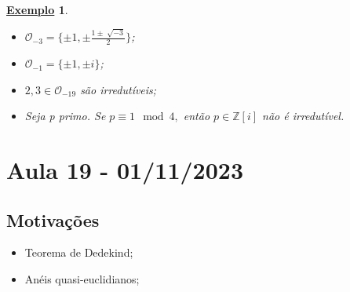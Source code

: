\documentclass{article}
\newtheorem{example}{\underline{Exemplo}}
\begin{document}
\begin{example}
 \begin{itemize}
  \item[1)] \(\mathcal{O}_{-3} = \{\pm1, \pm \frac{1\pm \sqrt[]{-3}}{2}\}\);
  \item[2)] \(\mathcal{O}_{-1} = \{\pm1, \pm i\}\);
  \item[3)] \(2, 3\in \mathcal{O}_{-19}\) são irredutíveis;
  \item[4)] Seja p primo. Se \(p\equiv 1 \mod 4,\) então \(p\in \mathbb{Z}[i]\) não é irredutível.
 \end{itemize}
\end{example}
\newpage

\section{Aula 19 - 01/11/2023}
\subsection{Motivações} 
\begin{itemize}
  \item Teorema de Dedekind;
  \item Anéis quasi-euclidianos;
\end{itemize}
\end{document}

